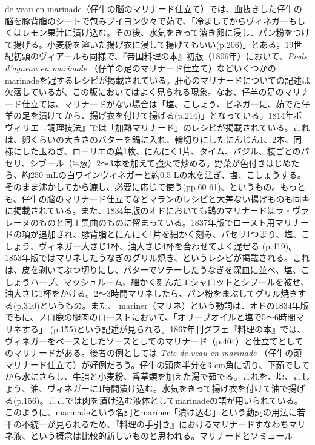 {{{{{  de veau en
  marinade}（仔牛の脳のマリナード仕立て）では、血抜きした仔牛の脳を豚背脂のシートで包みブイヨン少々で茹で、「冷ましてからヴィネガーもしくはレモン果汁に漬け込む。その後、水気をきって溶き卵に浸し、パン粉をつけて揚げる。小麦粉を溶いた揚げ衣に浸して揚げてもいい(p.206)」とある。19世紀初頭のヴィアールも同様で、『帝国料理の本』初版（1806年）において、\emph{Pieds
  d'agneau en marinade} （仔羊の足のマリナード仕立て）などいくつかの
  marinadeを冠するレシピが掲載されている。肝心のマリナードについての記述は欠落しているが、この版においてはよく見られる現象。なお、仔羊の足のマリナード仕立ては、マリナードがない場合は「塩、こしょう、ビネガーに、茹でた仔羊の足を漬けてから、揚げ衣を付けて揚げる(p.214)」となっている。1814年ボヴィリエ『調理技法』では「加熱マリナード」のレシピが掲載されている。これは、卵くらいの大きさのバターを鍋に入れ、輪切りにしたにんじん1、2本、同様にした玉ねぎ、ローリエの葉1枚、にんにく1片、タイム、バジル、枝ごとのパセリ、シブール（≒葱）2〜3本を加えて強火で炒める。野菜が色付きはじめたら、約250
  mLの白ワインヴィネガーと約0.5
  Lの水を注ぎ、塩、こしょうする。そのまま沸かしてから漉し、必要に応じて使う(pp.60-61)、というもの。もっとも、仔牛の脳のマリナード仕立てなどマランのレシピと大差ない揚げものも同書に掲載されている。また、1834年版のオドにおいても鶏のマリナードはラ・ヴァレーヌのものと同工異曲のものに留まっている。1837年版でロースト用マリナードの項が追加され、豚背脂とにんにく1片を細かく刻み、パセリ1つまり、塩、こしょう、ヴィネガー大さじ1杯、油大さじ4杯を合わせてよく混ぜる
  (p.419)。1853年版ではマリネしたうなぎのグリル焼き、というレシピが掲載される。これは、皮を剥いてぶつ切りにし、バターでソテーしたうなぎを深皿に並べ、塩、こしょうハーブ、マッシュルーム、細かく刻んだエシャロットとシブールを被せ、油大さじ1杯をかける。2〜3時間マリネしたら、パン粉をまぶしてグリル焼きする(p.310)というもの。また、
  mariner（マリネ）という動詞は、オドの1834年版でもに、ノロ鹿の腿肉のローストにおいて、「オリーブオイルと塩で5〜6時間マリネする」
  (p.155)という記述が見られる。1867年刊グフェ『料理の本』では、ヴィネガーをベースとしたソースとしてのマリナード（p.404）と仕立てとしてのマリナードがある。後者の例としては
  \emph{Tête de veau en marinade}
  （仔牛の頭　マリナード仕立て）が好例だろう。仔牛の頭肉半分を3
  cm角に切り、下茹でしてから水にさらし、牛脂と小麦粉、香草類を加えた湯で茹でる。これを、塩、こしょう、油、ヴィネガーに1時間漬け込む。水気をきって揚げ衣を付けて油で揚げる(p.156)。ここでは肉を漬け込む液体としてmarinadeの語が用いられている。このように、marinadeという名詞とmariner「漬け込む」という動詞の用法に若干の不統一が見られるため、『料理の手引き』におけるマリナードすなわちマリネ液、という概念は比較的新しいものと思われる。}}{マリナードとソミュール}}\label{marinades-et-saumures}}

